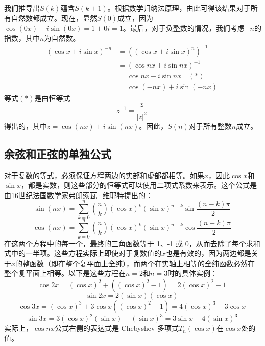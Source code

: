 我们推导出\( S(k) \)蕴含\( S(k+1) \)。根据数学归纳法原理，由此可得该结果对于所有自然数都成立。现在，显然\(S(0)\)成立，因为\( \cos(0x) + i \sin(0x) = 1 + 0i = 1 \)。最后，对于负整数的情况，我们考虑\( -n \)的指数，其中\( n \)为自然数。
\begin{equation}
\begin{aligned}
(\cos x + i \sin x)^{-n}
&= \left( (\cos x + i \sin x)^n \right)^{-1}\\
&= (\cos nx + i \sin nx)^{-1} \\
&= \cos nx - i \sin nx \quad (\ast)\\
&= \cos(-nx) + i \sin(-nx)
\end{aligned}~
\end{equation}
等式\( (\ast) \)是由恒等式
\[
z^{-1} = \frac{\bar{z}}{|z|^2}~
\]
得出的，其中\( z = \cos(nx) + i \sin(nx) \)。因此，\( S(n) \)对于所有整数\( n \)成立。
\subsection{余弦和正弦的单独公式}  
对于复数的等式，必须保证方程两边的实部和虚部都相等。如果\( x \)，因此\( \cos x \)和\( \sin x \)，都是实数，则这些部分的恒等式可以使用二项式系数来表示。这个公式是由16世纪法国数学家弗朗索瓦·维耶特提出的：
\[
\sin(nx) = \sum_{k=0}^{n} \binom{n}{k} (\cos x)^k (\sin x)^{n-k} \sin\frac{(n-k)\pi}{2}~
\]
\[
\cos(nx) = \sum_{k=0}^{n} \binom{n}{k} (\cos x)^k (\sin x)^{n-k} \cos \frac{(n-k)\pi}{2} ~
\]
在这两个方程中的每一个，最终的三角函数等于 1、-1 或 0，从而去除了每个求和式中的一半项。这些方程实际上即使对于复数值的\( x \)也是有效的，因为两边都是关于\( x \)的整函数（即在整个复平面上全纯），而两个在实轴上相等的全纯函数必然在整个复平面上相等。以下是这些方程在\( n = 2 \)和\( n = 3 \)时的具体实例：
\[
\cos 2x = (\cos x)^2 + \left( (\cos x)^2 - 1 \right) = 2(\cos x)^2 - 1~
\]
\[
\sin 2x = 2(\sin x)(\cos x)~
\]
\[
\cos 3x = (\cos x)^3 + 3\cos x \left( (\cos x)^2 - 1 \right) = 4(\cos x)^3 - 3\cos x~
\]
\[
\sin 3x = 3(\cos x)^2(\sin x) - (\sin x)^3 = 3\sin x - 4(\sin x)^3~
\]
实际上，\( \cos nx \)公式右侧的表达式是 Chebyshev 多项式\( T_n(\cos x) \)在\( \cos x \)处的值。